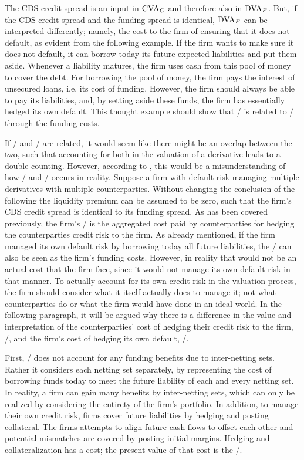 \documentclass[main.tex]{subfiles}
\begin{document}
    The CDS credit spread is an input in $\CVA/_{C}$ and therefore also in $\DVA/_{F}$.
    But, if the CDS credit spread and the funding spread is identical, $\DVA/_{F}$ can be interpreted differently;
    namely, the cost to the firm of ensuring that it does not default, as evident from the following example.
    If the firm wants to make sure it does not default,
    it can borrow today its future expected liabilities and put them aside.
    Whenever a liability matures, the firm uses cash from this pool of money to cover the debt.
    For borrowing the pool of money, the firm pays the interest of unsecured loans, i.e. its cost of funding.
    However, the firm should always be able to pay its liabilities,
    and, by setting aside these funds, the firm has essentially hedged its own default. 
    This thought example should show that \DVA/ is related to \FVA/ through the funding costs.
    
    If \DVA/ and \FVA/ are related, it would seem like there might be an overlap between the two,
    such that accounting for both in the valuation of a derivative leads to a double-counting.
    However, according to \textcite{Ruiz2015XVA}, 
    this would be a misunderstanding of how \DVA/ and \FVA/ occurs in reality.
    Suppose a firm with default risk managing multiple derivatives with multiple counterparties.
    Without changing the conclusion of the following the liquidity premium can be assumed to be zero, 
    such that the firm's CDS credit spread is identical to its funding spread.
    As has been covered previously, the firm's \DVA/ is the aggregated cost
    paid by counterparties for hedging the counterparties credit risk to the firm.
    As already mentioned, if the firm managed its own default risk by borrowing today all future liabilities,
    the \DVA/ can also be seen as the firm's funding costs.
    However, in reality that would not be an actual cost that the firm face,
    since it would not manage its own default risk in that manner.
    To actually account for its own credit risk in the valuation process,
    the firm should consider what it itself actually does to manage it;
    not what counterparties do or what the firm would have done in an ideal world.
    In the following paragraph, it will be argued why there is a difference 
    in the value and interpretation of the counterparties' cost of hedging their credit risk to the firm, \DVA/,
    and the firm's cost of hedging its own default, \FVA/.

    First, \DVA/ does not account for any funding benefits due to inter-netting sets.
    Rather it considers each netting set separately, by representing the cost 
    of borrowing funds today to meet the future liability of each and every netting set.
    In reality, a firm can gain many benefits by inter-netting sets,
    which can only be realized by considering the entirety of the firm's portfolio.
    In addition, to manage their own credit risk, firms cover future liabilities
    by hedging and posting collateral.
    The firms attempts to align future cash flows to offset each other
    and potential mismatches are covered by posting initial margins. 
    Hedging and collateralization has a cost; 
    the present value of that cost is the \FVA/.
\end{document}
